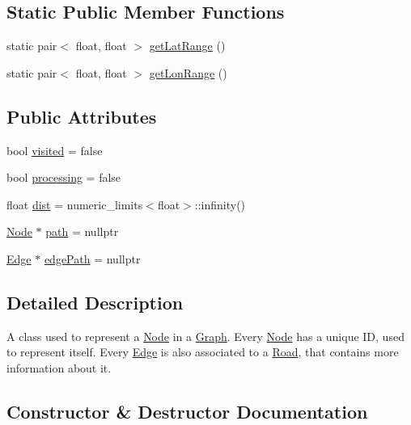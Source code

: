 \subsection*{Static Public Member Functions}
\begin{DoxyCompactItemize}
\item 
static pair$<$ float, float $>$ \hyperlink{class_node_a258af43995af26e3ce9401bdd4948b30}{get\+Lat\+Range} ()
\item 
static pair$<$ float, float $>$ \hyperlink{class_node_a8533c4ac90cb7bc99895546b161e7d5a}{get\+Lon\+Range} ()
\end{DoxyCompactItemize}
\subsection*{Public Attributes}
\begin{DoxyCompactItemize}
\item 
bool \hyperlink{class_node_aa1bdec4e775fc578632e6a2dced9e251}{visited} = false
\item 
bool \hyperlink{class_node_ac54c0bde41664161566c30ccf4f8a53e}{processing} = false
\item 
float \hyperlink{class_node_ae7efda4ec8512d44445f058a479589d3}{dist} = numeric\+\_\+limits$<$float$>$\+::infinity()
\item 
\hyperlink{class_node}{Node} $\ast$ \hyperlink{class_node_a569c555f532e04a5ef976a54cd3c82a0}{path} = nullptr
\item 
\hyperlink{class_edge}{Edge} $\ast$ \hyperlink{class_node_a547c4e0904d03f97ca32a66408b11584}{edge\+Path} = nullptr
\end{DoxyCompactItemize}


\subsection{Detailed Description}
A class used to represent a \hyperlink{class_node}{Node} in a \hyperlink{class_graph}{Graph}. Every \hyperlink{class_node}{Node} has a unique ID, used to represent itself. Every \hyperlink{class_edge}{Edge} is also associated to a \hyperlink{class_road}{Road}, that contains more information about it. 

\subsection{Constructor \& Destructor Documentation}
\hypertarget{class_node_a3662f8e557681586b8a44df334dbdfaa}{}\label{class_node_a3662f8e557681586b8a44df334dbdfaa} 
